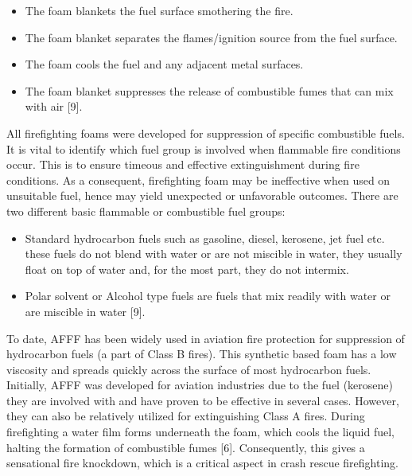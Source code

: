 \documentclass[12pt]{report}
\begin{document}
\begin{itemize}
    \item The foam blankets the fuel surface smothering the fire. 
    \item The foam blanket separates the flames/ignition source from the fuel surface. 
    \item The foam cools the fuel and any adjacent metal surfaces. 
    \item The foam blanket suppresses the release of combustible fumes that can mix with air [9]. 
\end{itemize}

All firefighting foams were developed for suppression of specific combustible fuels. It is vital to identify which fuel group is involved when flammable fire conditions occur. This is to ensure timeous and effective extinguishment during fire conditions. As a consequent, firefighting foam may be ineffective when used on unsuitable fuel, hence may yield unexpected or unfavorable outcomes. There are two different basic flammable or combustible fuel groups:

\begin{itemize}
    \item Standard hydrocarbon fuels such as gasoline, diesel, kerosene, jet fuel etc. these fuels do not blend with water or are not miscible in water, they usually float on top of water and, for the most part, they do not intermix.
    \item Polar solvent or Alcohol type fuels are fuels that mix readily with water or are miscible in water [9].
\end{itemize}

To date, AFFF has been widely used in aviation fire protection for suppression of hydrocarbon fuels (a part of Class B fires). This synthetic based foam has a low viscosity and spreads quickly across the surface of most hydrocarbon fuels. Initially, AFFF was developed for aviation industries due to the fuel (kerosene) they are involved with and have proven to be effective in several cases. However, they can also be relatively utilized for extinguishing Class A fires. During firefighting a water film forms underneath the foam, which cools the liquid fuel, halting the formation of combustible fumes [6]. Consequently, this gives a sensational fire knockdown, which is a critical aspect in crash rescue firefighting.
\end{document}
